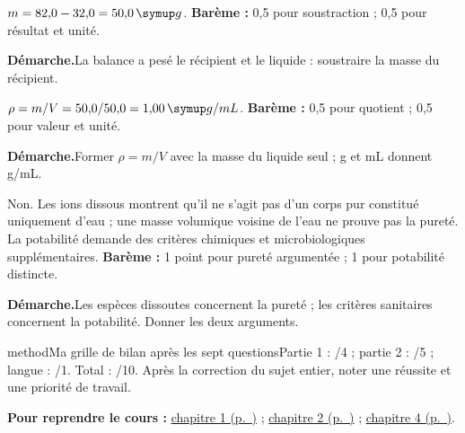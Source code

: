 \label{cor-bb-2}
\par\noindent\begin{minipage}{\linewidth}
$m=82{,}0-32{,}0=50{,}0\unite g$. \textbf{Barème :} 0,5 pour soustraction ; 0,5 pour résultat et unité.\par
\smallskip\noindent\textbf{Démarche.}\enspace La balance a pesé le récipient et le liquide : soustraire la masse du récipient.\par
\end{minipage}\par
\par\noindent\begin{minipage}{\linewidth}
$\rho=m/V=50{,}0/50{,}0=1{,}00\unite{g/mL}$. \textbf{Barème :} 0,5 pour quotient ; 0,5 pour valeur et unité.\par
\smallskip\noindent\textbf{Démarche.}\enspace Former $\rho=m/V$ avec la masse du liquide seul ; g et mL donnent g/mL.\par
{}
\end{minipage}\par
\par\noindent\begin{minipage}{\linewidth}
Non. Les ions dissous montrent qu’il ne s’agit pas d’un corps pur constitué uniquement d’eau ; une masse volumique voisine de l’eau ne prouve pas la pureté. La potabilité demande des critères chimiques et microbiologiques supplémentaires. \textbf{Barème :} 1 point pour pureté argumentée ; 1 pour potabilité distincte.\par
\smallskip\noindent\textbf{Démarche.}\enspace Les espèces dissoutes concernent la pureté ; les critères sanitaires concernent la potabilité. Donner les deux arguments.\par
\end{minipage}\par
\par\noindent\begin{minipage}{\linewidth}
\begin{pcEncadre}{method}{Ma grille de bilan après les sept questions}Partie 1 : /4 ; partie 2 : /5 ; langue : /1. Total : /10. Après la correction du sujet entier, noter une réussite et une priorité de travail.\end{pcEncadre}
{\small\textbf{Pour reprendre le cours : }\hyperref[chap-1]{chapitre 1 (p.~\pageref*{chap-1})} ; \hyperref[chap-2]{chapitre 2 (p.~\pageref*{chap-2})} ; \hyperref[chap-4]{chapitre 4 (p.~\pageref*{chap-4})}.\par}\end{minipage}\par
